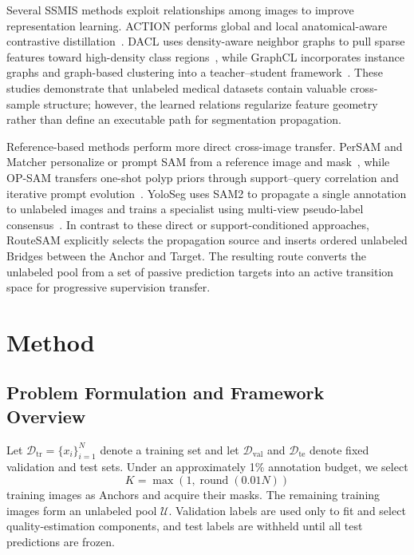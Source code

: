 \documentclass[a4paper,fleqn]{cas-dc}
\begin{document}
Several SSMIS methods exploit relationships among images to improve representation learning. ACTION performs global and local anatomical-aware contrastive distillation~\cite{you2022action}. DACL uses density-aware neighbor graphs to pull sparse features toward high-density class regions~\cite{tang2024dacl}, while GraphCL incorporates instance graphs and graph-based clustering into a teacher--student framework~\cite{wang2024graphcl}. These studies demonstrate that unlabeled medical datasets contain valuable cross-sample structure; however, the learned relations regularize feature geometry rather than define an executable path for segmentation propagation.

Reference-based methods perform more direct cross-image transfer. PerSAM and Matcher personalize or prompt SAM from a reference image and mask~\cite{zhang2023persam,liu2023matcher}, while OP-SAM transfers one-shot polyp priors through support--query correlation and iterative prompt evolution~\cite{mao2025opsam}. YoloSeg uses SAM2 to propagate a single annotation to unlabeled images and trains a specialist using multi-view pseudo-label consensus~\cite{zhang2026yoloseg}. In contrast to these direct or support-conditioned approaches, RouteSAM explicitly selects the propagation source and inserts ordered unlabeled Bridges between the Anchor and Target. The resulting route converts the unlabeled pool from a set of passive prediction targets into an active transition space for progressive supervision transfer.

\section{Method}\label{sec:method}

\subsection{Problem Formulation and Framework Overview}

Let $\mathcal{D}_{\mathrm{tr}}=\{x_i\}_{i=1}^{N}$ denote a training set and let $\mathcal{D}_{\mathrm{val}}$ and $\mathcal{D}_{\mathrm{te}}$ denote fixed validation and test sets. Under an approximately 1\% annotation budget, we select
\begin{equation}
K=\max\left(1,\operatorname{round}(0.01N)\right)
\end{equation}
training images as Anchors and acquire their masks. The remaining training images form an unlabeled pool $\mathcal{U}$. Validation labels are used only to fit and select quality-estimation components, and test labels are withheld until all test predictions are frozen.
\end{document}
